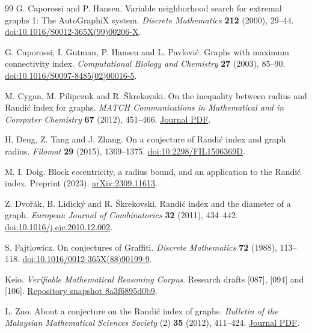 \documentclass[11pt,a4paper]{article}
\begin{document}
\begin{thebibliography}{99}
G. Caporossi and P. Hansen.
Variable neighborhood search for extremal graphs 1: The AutoGraphiX system.
\emph{Discrete Mathematics} \textbf{212} (2000), 29--44.
\href{https://doi.org/10.1016/S0012-365X(99)00206-X}{doi:10.1016/S0012-365X(99)00206-X}.

G. Caporossi, I. Gutman, P. Hansen and L. Pavlovi\'c.
Graphs with maximum connectivity index.
\emph{Computational Biology and Chemistry} \textbf{27} (2003), 85--90.
\href{https://doi.org/10.1016/S0097-8485(02)00016-5}{doi:10.1016/S0097-8485(02)00016-5}.

M. Cygan, M. Pilipczuk and R. \v{S}krekovski.
On the inequality between radius and Randi\'c index for graphs.
\emph{MATCH Communications in Mathematical and in Computer Chemistry}
\textbf{67} (2012), 451--466.
\href{https://match.pmf.kg.ac.rs/electronic_versions/Match67/n2/match67n2_451-466.pdf}{Journal PDF}.

H. Deng, Z. Tang and J. Zhang.
On a conjecture of Randi\'c index and graph radius.
\emph{Filomat} \textbf{29} (2015), 1369--1375.
\href{https://doi.org/10.2298/FIL1506369D}{doi:10.2298/FIL1506369D}.

M. I. Doig.
Block eccentricity, a radius bound, and an application to the Randi\'c index.
Preprint (2023). \href{https://arxiv.org/abs/2309.11613}{arXiv:2309.11613}.

Z. Dvo\v{r}\'ak, B. Lidick\'y and R. \v{S}krekovski.
Randi\'c index and the diameter of a graph.
\emph{European Journal of Combinatorics} \textbf{32} (2011), 434--442.
\href{https://doi.org/10.1016/j.ejc.2010.12.002}{doi:10.1016/j.ejc.2010.12.002}.

S. Fajtlowicz.
On conjectures of Graffiti.
\emph{Discrete Mathematics} \textbf{72} (1988), 113--118.
\href{https://doi.org/10.1016/0012-365X(88)90199-9}{doi:10.1016/0012-365X(88)90199-9}.

Keio.
\emph{Verifiable Mathematical Reasoning Corpus}.
Research drafts [087], [094] and [106].
\href{https://github.com/QEEDDD/Verifiable-Mathematical-Reasoning-Corpus/tree/8a3f6895d0b9b9f125e43157e4a003a2a2b51704}{Repository snapshot 8a3f6895d0b9}.

L. Zuo.
About a conjecture on the Randi\'c index of graphs.
\emph{Bulletin of the Malaysian Mathematical Sciences Society}
(2) \textbf{35} (2012), 411--424.
\href{https://math.usm.my/bulletin/pdf/v35n2/v35n2p16.pdf}{Journal PDF}.


\end{thebibliography}
\end{document}

